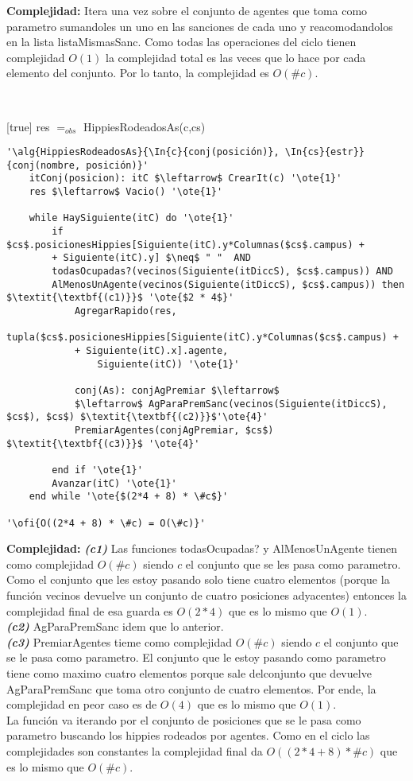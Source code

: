 \textbf{Complejidad:} Itera una vez sobre el conjunto de agentes que toma como parametro sumandoles un uno en las sanciones de cada uno y reacomodandolos en la lista listaMismasSanc. Como todas las operaciones del ciclo tienen complejidad $O(1)$ la complejidad total es las veces que lo hace por cada elemento del conjunto. Por lo tanto, la complejidad es $O(\#c)$.

~


[true]
{res $=_{obs}$ HippiesRodeadosAs(c,cs)}

\begin{lstlisting}[mathescape]
'\alg{HippiesRodeadosAs}{\In{c}{conj(posición)}, \In{cs}{estr}}{conj(nombre, posición)}'
	itConj(posicion): itC $\leftarrow$ CrearIt(c) '\ote{1}'
	res $\leftarrow$ Vacio() '\ote{1}'

	while HaySiguiente(itC) do '\ote{1}'
		if $cs$.posicionesHippies[Siguiente(itC).y*Columnas($cs$.campus) +
		+ Siguiente(itC).y] $\neq$ " "  AND
		todasOcupadas?(vecinos(Siguiente(itDiccS), $cs$.campus)) AND
		AlMenosUnAgente(vecinos(Siguiente(itDiccS), $cs$.campus)) then $\textit{\textbf{(c1)}}$ '\ote{$2 * 4$}'
			AgregarRapido(res,
			tupla($cs$.posicionesHippies[Siguiente(itC).y*Columnas($cs$.campus) +
			+ Siguiente(itC).x].agente,
				Siguiente(itC)) '\ote{1}'

			conj(As): conjAgPremiar $\leftarrow$
			$\leftarrow$ AgParaPremSanc(vecinos(Siguiente(itDiccS), $cs$), $cs$) $\textit{\textbf{(c2)}}$'\ote{4}'
			PremiarAgentes(conjAgPremiar, $cs$) $\textit{\textbf{(c3)}}$ '\ote{4}'

		end if '\ote{1}'
		Avanzar(itC) '\ote{1}'
	end while '\ote{$(2*4 + 8) * \#c$}'

'\ofi{O((2*4 + 8) * \#c) = O(\#c)}'
\end{lstlisting}

\textbf{Complejidad:} \textit{\textbf{(c1)}} Las funciones todasOcupadas? y AlMenosUnAgente tienen como complejidad $O(\#c)$ siendo $c$ el conjunto que se les pasa como parametro. Como el conjunto que les estoy pasando solo tiene cuatro elementos (porque la función vecinos devuelve un conjunto de cuatro posiciones adyacentes) entonces la complejidad final de esa guarda es $O(2*4)$ que es lo mismo que $O(1)$. \\
\textit{\textbf{(c2)}} AgParaPremSanc idem que lo anterior. \\
\textit{\textbf{(c3)}} PremiarAgentes tieme como complejidad $O(\#c)$ siendo $c$ el conjunto que se le pasa como parametro. El conjunto que le estoy pasando como parametro tiene como maximo cuatro elementos porque sale delconjunto que devuelve AgParaPremSanc que toma otro conjunto de cuatro elementos. Por ende, la complejidad en peor caso es de $O(4)$ que es lo mismo que $O(1)$. \\
La función va iterando por el conjunto de posiciones que se le pasa como parametro buscando los hippies rodeados por agentes. Como en el ciclo las complejidades son constantes la complejidad final da $O((2*4+8)*\#c)$ que es lo mismo que $O(\#c)$.

